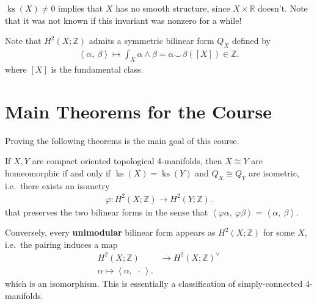 \begin{remark}

\(\operatorname{ks}(X) \neq 0\) implies that \(X\) has no smooth
structure, since \(X \times{\mathbb{R}}\) doesn't. Note that it was not
known if this invariant was nonzero for a while!

\end{remark}

\begin{remark}

Note that \(H^2(X; {\mathbb{Z}})\) admits a symmetric bilinear form
\(Q_X\) defined by
\begin{align*}
{\left\langle { \alpha},~{ \beta} \right\rangle} \mapsto \int_X \alpha\wedge \beta = \alpha \smile\beta([X]) \in {\mathbb{Z}}
.\end{align*}
where \([X]\) is the fundamental class.

\end{remark}

\hypertarget{main-theorems-for-the-course}{%
\section{Main Theorems for the
Course}\label{main-theorems-for-the-course}}

Proving the following theorems is the main goal of this course.

\begin{theorem}[Freedman]

If \(X, Y\) are compact oriented topological 4-manifolds, then
\(X\cong Y\) are homeomorphic if and only if
\(\operatorname{ks}(X) = \operatorname{ks}(Y)\) and \(Q_X \cong Q_Y\)
are isometric, i.e.~there exists an isometry
\begin{align*}
\varphi: H^2(X; {\mathbb{Z}}) \to H^2(Y; {\mathbb{Z}})
.\end{align*}
that preserves the two bilinear forms in the sense that
\({\left\langle {\varphi \alpha},~{ \varphi \beta} \right\rangle} = {\left\langle { \alpha},~{ \beta} \right\rangle}\).

Conversely, every \textbf{unimodular} bilinear form appears as
\(H^2(X; {\mathbb{Z}})\) for some \(X\), i.e.~the pairing induces a map
\begin{align*}
H^2(X; {\mathbb{Z}}) &\to H^2(X; {\mathbb{Z}})^\vee\\
\alpha \mapsto {\left\langle { \alpha },~{ {\,\cdot\,}} \right\rangle}
.\end{align*}
which is an isomorphism. This is essentially a classification of
simply-connected 4-manifolds.

\end{theorem}

